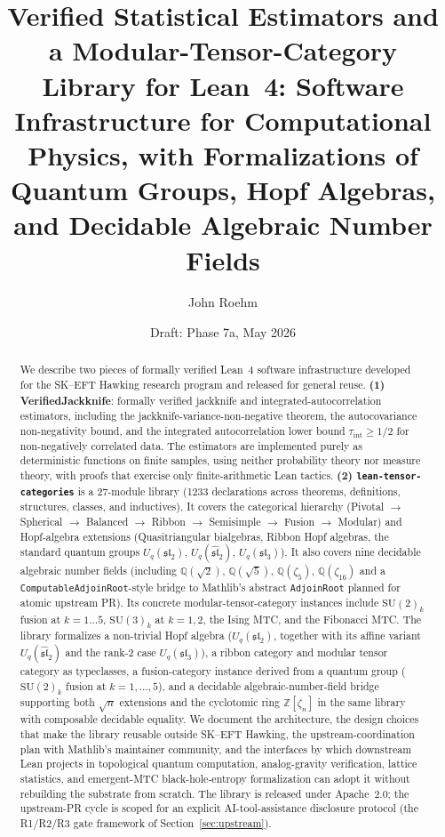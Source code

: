 \documentclass[11pt]{article}
\title{Verified Statistical Estimators and a Modular-Tensor-Category
Library for Lean~4: Software Infrastructure for Computational
Physics, with Formalizations of Quantum Groups, Hopf Algebras, and
Decidable Algebraic Number Fields}
\author{John Roehm}
\date{Draft: Phase 7a, May 2026}
\begin{document}
\maketitle

\begin{abstract}
We describe two pieces of formally verified Lean~4 software
infrastructure developed for the SK--EFT Hawking research program
and released for general reuse.
\textbf{(1) VerifiedJackknife}: formally verified jackknife
and integrated-autocorrelation estimators, including the
jackknife-variance-non-negative theorem,
the autocovariance non-negativity bound, and the integrated
autocorrelation lower bound $\tau_{\mathrm{int}} \geq 1/2$ for
non-negatively correlated data. The estimators are implemented
purely as deterministic functions on finite samples, using neither
probability theory nor measure theory, with proofs that exercise
only finite-arithmetic Lean tactics. \textbf{(2)
\texttt{lean-tensor-categories}} is a 27-module library
(1233 declarations across theorems, definitions,
structures, classes, and inductives). It covers the categorical
hierarchy
(Pivotal $\to$ Spherical $\to$ Balanced $\to$ Ribbon $\to$
Semisimple $\to$ Fusion $\to$ Modular) and Hopf-algebra extensions
(Quasitriangular bialgebras, Ribbon Hopf algebras, the standard
quantum groups $U_q(\mathfrak{sl}_2)$, $U_q(\widehat{\mathfrak{sl}}_2)$,
$U_q(\mathfrak{sl}_3)$). It also covers nine decidable algebraic number fields
(including $\mathbb{Q}(\sqrt{2})$, $\mathbb{Q}(\sqrt{5})$,
$\mathbb{Q}(\zeta_5)$, $\mathbb{Q}(\zeta_{16})$ and a
\texttt{ComputableAdjoinRoot}-style bridge to Mathlib's abstract
\texttt{AdjoinRoot} planned for atomic upstream PR). Its concrete
modular-tensor-category instances include $\mathrm{SU}(2)_k$ fusion at
$k=1{\ldots}5$, $\mathrm{SU}(3)_k$ at $k=1, 2$, the Ising MTC, and
the Fibonacci MTC.
The library formalizes a non-trivial Hopf algebra ($U_q(\mathfrak{sl}_2)$,
together with its affine variant $U_q(\widehat{\mathfrak{sl}}_2)$
and the rank-2 case $U_q(\mathfrak{sl}_3)$),
a ribbon category and modular tensor category as typeclasses, a
fusion-category instance derived from a quantum group ($\mathrm{SU}(2)_k$
fusion at $k=1,\ldots,5$), and a decidable algebraic-number-field bridge
supporting both $\sqrt{n}$ extensions and the cyclotomic ring
$\mathbb{Z}[\zeta_n]$ in the same library with composable decidable
equality.
We document the architecture, the design choices that make the
library reusable outside SK--EFT Hawking, the upstream-coordination
plan with Mathlib's maintainer community, and the interfaces by
which downstream Lean projects in topological quantum computation,
analog-gravity verification, lattice statistics, and emergent-MTC
black-hole-entropy formalization can adopt it without rebuilding
the substrate from scratch. The library is released under
Apache~2.0; the upstream-PR cycle is scoped for an explicit
AI-tool-assistance disclosure protocol (the R1/R2/R3 gate framework
of Section~\ref{sec:upstream}).
\end{abstract}
\end{document}
